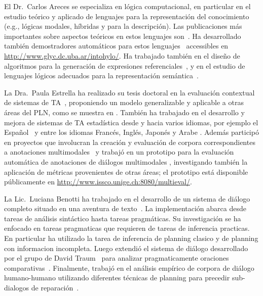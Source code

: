 
El Dr.\ Carlos Areces se especializa en l\'ogica
computacional,
en particular en el estudio te\'orico y aplicado de lenguajes para la
representaci\'on del conocimiento (e.g., l\'ogicas modales, h\'ibridas y
para la descripci\'on).  Las publicaciones
m\'as importantes sobre aspectos te\'oricos en estos lenguajes
son~\cite{ABM01,arec:hybr05b}.  Ha desarrollado tambi\'en demostradores
autom\'aticos para estos lenguajes~\cite{ANR01,arec:hylo02a,AG06,Hoffmann2007}
accessibles en \url{http://www.glyc.dc.uba.ar/intohylo/}.
Ha trabajado tambi\'en en el dise\~no de algoritmos para la generaci\'on de
expresiones referenciales~\cite{AKS08}, y en el estudio de lenguajes l\'ogicos
adecuados para la representaci\'on sem\'antica~\cite{AF08}.

La Dra.\ Paula Estrella ha realizado su tesis doctoral en la 
evaluaci\'on contextual de sistemas de TA~\cite{estr:impr08,estr:femt09},
proponiendo 
un modelo generalizable y aplicable a otras \'areas del PLN, como se muestra en 
\cite{Miller2008}. Tambi\'en ha trabajado en el desarrollo y mejora de sistemas
de TA 
estad\'istica desde y hacia varios idiomas, por ejemplo el
Espa\~nol~\cite{estr:expe05} 
y entre los idiomas Franc\'es, Ingl\'es, Japon\'es y Arabe
\cite{rayner-EtAl:2009:GEAF}. 
Adem\'as particip\'o en proyectos que involucran la creaci\'on y evaluaci\'on de
corpora 
correspondientes a anotaciones multimodales~\cite{pope:estr07} y trabaj\'o en un
prototipo 
para la evaluaci\'on autom\'atica de anotaciones de di\'alogos multimodales
\cite{multieval}, 
investigando tambi\'en la aplicaci\'on de m\'etricas provenientes de otras
\'areas; el 
prototipo est\'a disponible p\'ublicamente en
\url{http://www.issco.unige.ch:8080/multieval/}.


La Lic.\ Luciana Benotti ha trabajado en el desarrollo de un sistema de
di\'alogo completo situado en una aventura de
texto~\cite{benotti09b}. La implementaci\'on abarca desde tareas de an\'alisis
sint\'actico hasta tareas pragm\'aticas. Su investigaci\'on se ha enfocado en
tareas pragmaticas que requieren de tareas de inferencia practicas. En
particular ha utilizado la tarea de inferencia de planning clasico y de
planning con informacion incompleta. Luego extendi\'o el sistema de di\'alogo
desarrollado por el grupo de David Traum~\cite{TraumSigdialBook08} para
analizar pragmaticamente oraciones comparativas~\cite{benotti09a}. Finalmente,
trabaj\'o en el an\'alisis emp\'irico de corpora de di\'alogo humano-humano
utilizando
diferentes t\'ecnicas de planning para precedir sub-dialogos de
reparaci\'on~\cite{benotti09c}.








